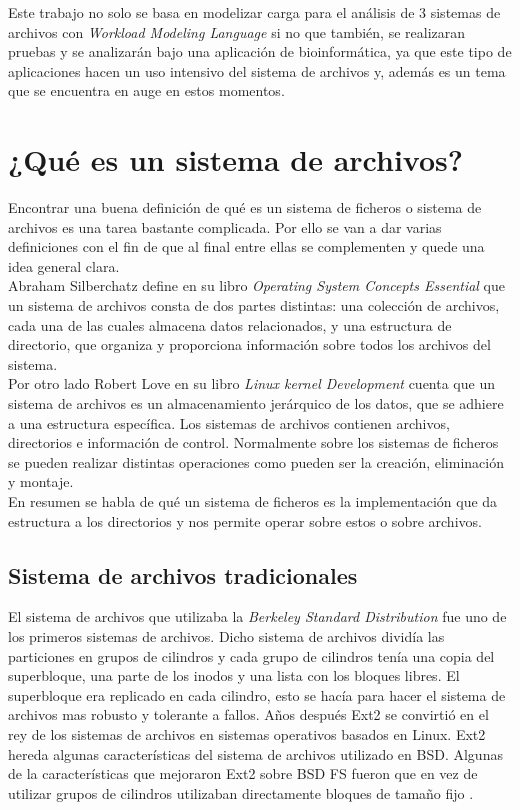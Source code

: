 Este trabajo no solo se basa en modelizar carga para el análisis de 3 sistemas de archivos con \textit{Workload Modeling Language} si no que también, se realizaran pruebas y se analizarán bajo una aplicación de bioinformática, ya que este tipo de aplicaciones hacen un uso intensivo del sistema de archivos y, además es un tema que se encuentra en auge en estos momentos.


\section{¿Qué es un sistema de archivos?}
Encontrar una buena definición de qué es un sistema de ficheros o sistema de archivos es una tarea bastante complicada. Por ello se van a dar varias definiciones con el fin de que al final entre ellas se complementen y quede una idea general clara. \\

Abraham Silberchatz define en su libro \textit{Operating System Concepts Essential} \cite{silberchatz} que un sistema de archivos consta de dos partes distintas: una colección de archivos, cada una de las cuales almacena datos relacionados, y una estructura de directorio, que organiza y proporciona información sobre todos los archivos del sistema.\\

Por otro lado Robert Love en su libro \textit{Linux kernel Development} \cite{LinuxKernelDev} cuenta que un sistema de archivos es un almacenamiento jerárquico de los datos, que se adhiere a una estructura específica. Los sistemas de archivos contienen archivos, directorios e información de control. Normalmente sobre los sistemas de ficheros se pueden realizar distintas operaciones como pueden ser la creación, eliminación y montaje.\\

En resumen se habla de qué un sistema de ficheros es la implementación que da estructura a los directorios y nos permite operar sobre estos o sobre archivos.

\subsection{Sistema de archivos tradicionales}
El sistema de archivos que utilizaba la \textit{Berkeley Standard Distribution} fue uno de los primeros sistemas de archivos. Dicho sistema de archivos dividía las particiones en grupos de cilindros y cada grupo de cilindros tenía una copia del superbloque, una parte de los inodos y una lista con los bloques libres. El superbloque era replicado en cada cilindro, esto se hacía para hacer el sistema de archivos mas robusto y tolerante a fallos. Años después Ext2 se convirtió en el rey de los sistemas de archivos en sistemas operativos basados en Linux. Ext2 hereda algunas características del sistema de archivos utilizado en BSD. Algunas de la características que mejoraron Ext2 sobre BSD FS fueron que en vez de utilizar grupos de cilindros utilizaban directamente bloques de tamaño fijo \cite{LinuxKernelDev}.


